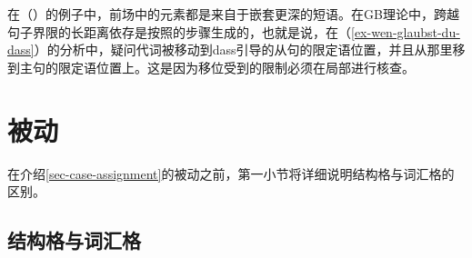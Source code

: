 \zl
在（）的例子中，前场中的元素都是来自于嵌套更深的短语。在GB理论中，跨越句子界限的长距离依存是按照\citep[--79]{Grewendorf88a}的步骤生成的，也就是说，在（\ref{ex-wen-glaubst-du-dass}）的分析中，疑问代词被移动到dass引导的从句的限定语位置，并且从那里移到主句的限定语位置上。这是因为移位受到的限制必须在局部进行核查。

\section{被动}
\label{Abschnitt-GB-Passiv}\label{sec-passive-gb}

在介绍\ref{sec-case-assignment}的被动之前，第一小节将详细说明结构格与词汇格的区别。

\subsection{结构格与词汇格}
\label{Abschnitt-struktureller-Kasus}

